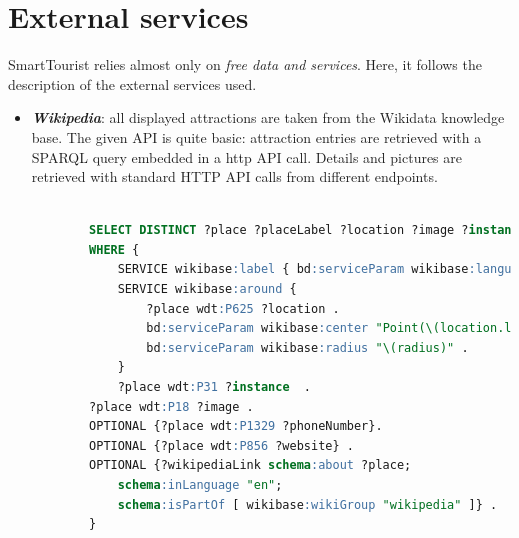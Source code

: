 \documentclass[a4paper, 11pt, parskip=half]{scrreprt}
\theoremstyle{definition}
\begin{document}
\section{External services}

SmartTourist relies almost only on \textit{free data and services}. Here, it follows the description of the external services used.

\begin{itemize}
	\item \textit{\textbf{Wikipedia}}: all displayed attractions are taken from the Wikidata knowledge base. The given API is quite basic: attraction entries are retrieved with a SPARQL query embedded in a http API call. Details and pictures are retrieved with standard HTTP API calls from different endpoints.
		
		\begin{lstlisting}[language=sql, caption={SPARQL query for attraction retrieving}, captionpos=b]
		
		SELECT DISTINCT ?place ?placeLabel ?location ?image ?instance ?phoneNumber ?website ?wikipediaLink
        WHERE {
            SERVICE wikibase:label { bd:serviceParam wikibase:language "en, it" }
            SERVICE wikibase:around {
                ?place wdt:P625 ?location .
                bd:serviceParam wikibase:center "Point(\(location.longitude) \(location.latitude))"^^geo:wktLiteral .
                bd:serviceParam wikibase:radius "\(radius)" .
            }
            ?place wdt:P31 ?instance  .
        ?place wdt:P18 ?image .
        OPTIONAL {?place wdt:P1329 ?phoneNumber}.
        OPTIONAL {?place wdt:P856 ?website} .
        OPTIONAL {?wikipediaLink schema:about ?place;
            schema:inLanguage "en";
            schema:isPartOf [ wikibase:wikiGroup "wikipedia" ]} .
        }
		\end{lstlisting}
		

\end{itemize}
\end{document}
